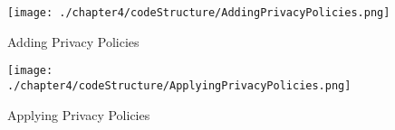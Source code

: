 \begin{figure}
\centering
{\texttt{[image: ./chapter4/codeStructure/AddingPrivacyPolicies.png]}}
\caption{Adding Privacy Policies}
\label{fig:Adding Privacy Policies}
\end{figure}

\begin{figure}
\centering
{\texttt{[image: ./chapter4/codeStructure/ApplyingPrivacyPolicies.png]}}
\caption{Applying Privacy Policies}
\label{fig:Applying Privacy Policies}
\end{figure}



















